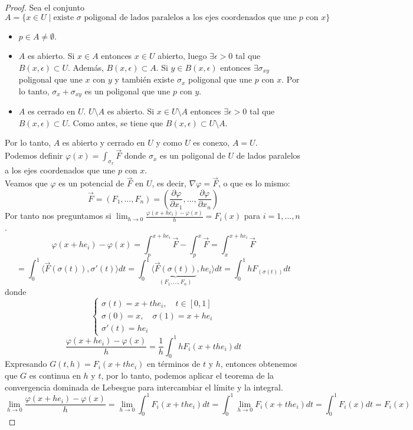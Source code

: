 \begin{proof}
    Sea el conjunto $$A = \{x \in U \mid \text{existe } \sigma \text{ poligonal de lados paralelos a los ejes coordenados que une } p \text{ con } x\}$$
    \begin{itemize}
        \item $p \in A \neq \emptyset$.
        \item $A$ es abierto. Si $x \in A$ entonces $x \in U$ abierto, luego $\exists \epsilon > 0$ tal que $B(x, \epsilon) \subset U$. Además, $B(x, \epsilon) \subset A$. Si $y \in B(x, \epsilon)$ entonces $\exists \sigma_{xy}$ poligonal que une $x$ con $y$ y también existe $\sigma_{x}$ poligonal que une $p$ con $x$. Por lo tanto, $\sigma_{x} + \sigma_{xy}$ es un poligonal que une $p$ con $y$.
        \item $A$ es cerrado en $U$. $U \setminus A$ es abierto. Si $x \in U \setminus A$ entonces $\exists \epsilon > 0$ tal que $B(x, \epsilon) \subset U$. Como antes, se tiene que $B(x, \epsilon) \subset U \setminus A$.
    \end{itemize}
    Por lo tanto, $A$ es abierto y cerrado en $U$ y como $U$ es conexo, $A = U$.\\
    Podemos definir $\varphi(x) = \int_{\sigma_{x}} \vec{F}$ donde $\sigma_{x}$ es un poligonal de $U$ de lados paralelos a los ejes coordenados que une $p$ con $x$.\\
    Veamos que $\varphi$ es un potencial de $\vec{F}$ en $U$, es decir, $\nabla \varphi = \vec{F}$, o que es lo mismo:
    $$\vec{F} = (F_1, \ldots, F_n) = \left(\frac{\partial \varphi}{\partial x_1}, \ldots, \frac{\partial \varphi}{\partial x_n}\right)$$
    Por tanto nos preguntamos si $\lim_{h \to 0} \frac{\varphi(x + he_i) - \varphi(x)}{h} = F_i(x)$ para $i = 1, \ldots, n$.
    $$ \varphi (x + he_i) - \varphi(x) = \int_{p}^{x + he_i} \vec{F} - \int_{p}^{x} \vec{F} = \int_{x}^{x + he_i} \vec{F}$$
    $$= \int_{0}^{1} \langle \vec{F}(\sigma(t)), \sigma'(t) \rangle dt
        = \int_{0}^{1} \langle \underbrace{\vec{F}(\sigma(t))}_{(F_1, \ldots, F_n)},
        h e_i \rangle dt = \int_{0}^{1} h F_(\sigma(t)) dt$$
    donde
    \[
        \begin{cases}
            \sigma(t) = x + the_i, \quad t \in [0,1]  \\
            \sigma(0) = x, \quad \sigma(1) = x + he_i \\
            \sigma'(t) = h e_i
        \end{cases}
    \]
    $$ \frac{\varphi(x+he_i)-\varphi(x)}{h} = \frac{1}{h} \int_{0}^{1} h F_i(x+the_i) dt$$
    Expresando $G(t,h) = F_i(x+the_i)$ en términos de $t$ y $h$, entonces obtenemos que $G$ es continua en $h$ y $t$, por lo tanto, podemos aplicar el teorema de la convergencia dominada de Lebesgue para intercambiar el límite y la integral.
    $$\lim_{h \to 0} \frac{\varphi(x+he_i)-\varphi(x)}{h} = \lim_{h \to 0} \int_{0}^{1} F_i(x+the_i) dt = \int_{0}^{1} \lim_{h \to 0} F_i(x+the_i) dt = \int_{0}^{1} F_i(x) dt = F_i(x)$$
\end{proof}

